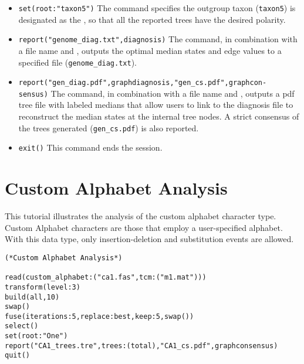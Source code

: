 \begin{itemize}
\item \texttt{set(root:"taxon5")} The  command specifies the outgroup taxon (\texttt{taxon5}) 
is designated as the , so that all the reported trees have the desired polarity.
\item \texttt{report("genome\_diag.txt",diagnosis)}  The  command, in combination with a file name and
 , outputs the optimal median states and edge values to a specified file (\texttt{genome\_diag.txt}). 
\item \texttt{report("gen\_diag.pdf",graphdiagnosis,"gen\_cs.pdf",graphcon-\\sensus)}  The  command, 
in combination with a file name and , outputs a pdf tree file with labeled medians that allow 
users to link to the diagnosis file to reconstruct the median states at the internal tree nodes. A strict consensus
of the trees generated (\texttt{gen\_cs.pdf}) is also reported. 
\item \texttt{exit()} This command ends the \poy session.
\end{itemize}


\section{Custom Alphabet Analysis}{\label{tutorial12}}

This tutorial illustrates the analysis of the custom alphabet character type.  Custom Alphabet characters are 
those that employ a user-specified alphabet. With this data type, only insertion-deletion and substitution events are allowed.

\begin{verbatim}
(*Custom Alphabet Analysis*)

read(custom_alphabet:("ca1.fas",tcm:("m1.mat")))
transform(level:3)
build(all,10)
swap()
fuse(iterations:5,replace:best,keep:5,swap())
select()
set(root:"One")
report("CA1_trees.tre",trees:(total),"CA1_cs.pdf",graphconsensus)
quit()
\end{verbatim}

